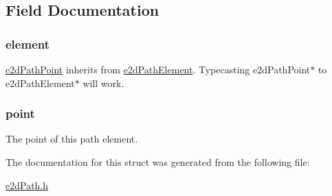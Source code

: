 \subsection{Field Documentation}
\hypertarget{structe2dPathPoint_a88e514266530010a1a3b08198b3cc763}{
\subsubsection[{element}]{ {\bf element}}}\label{structe2dPathPoint_a88e514266530010a1a3b08198b3cc763}
\hyperlink{structe2dPathPoint}{e2d\-Path\-Point} inherits from \hyperlink{structe2dPathElement}{e2d\-Path\-Element}. Typecasting e2d\-Path\-Point$\ast$ to e2d\-Path\-Element$\ast$ will work. \hypertarget{structe2dPathPoint_afff60c971a4d4728af80b4753d30c5bf}{
\subsubsection[{point}]{ {\bf point}}}\label{structe2dPathPoint_afff60c971a4d4728af80b4753d30c5bf}
The point of this path element. 

The documentation for this struct was generated from the following file\-:\begin{DoxyCompactItemize}
\item 
\hyperlink{e2dPath_8h}{e2d\-Path.\-h}\end{DoxyCompactItemize}
